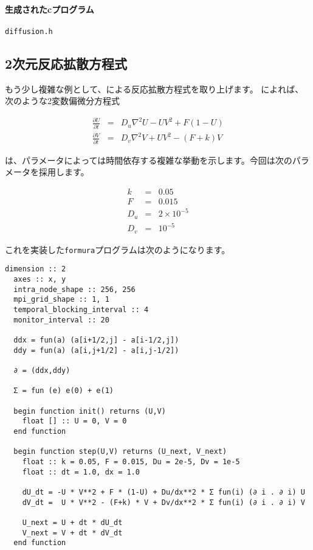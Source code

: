 \documentclass{jsarticle}
\newcommand{\formura}{{\texttt{formura}}}
\begin{document}
\paragraph{生成されたcプログラム}

\verb`diffusion.h`



\subsection{2次元反応拡散方程式}

もう少し複雑な例として、\citet{pearson1993complex}による反応拡散方程式を取り上げます。
\citet{pearson1993complex}によれば、次のような2変数偏微分方程式

\begin{eqnarray}
  \frac{\partial U}{\partial t} &=& D_u \nabla^2 U - UV^2 + F(1-U)\\
  \frac{\partial V}{\partial t} &=& D_v \nabla^2 V + UV^2 - (F+k)V
\end{eqnarray}

は、パラメータによっては時間依存する複雑な挙動を示します。今回は次のパラメータを採用します。

\begin{eqnarray}
  k &=& 0.05\\
  F &=& 0.015\\
  D_u &=& 2 \times 10^{-5}\\
  D_v &=& 10^{-5}
\end{eqnarray}

これを実装した\formura プログラムは次のようになります。

\begin{lstlisting}[mathescape]
  dimension :: 2
  axes :: x, y
  intra_node_shape :: 256, 256
  mpi_grid_shape :: 1, 1
  temporal_blocking_interval :: 4
  monitor_interval :: 20

  ddx = fun(a) (a[i+1/2,j] - a[i-1/2,j])
  ddy = fun(a) (a[i,j+1/2] - a[i,j-1/2])

  ∂ = (ddx,ddy)

  Σ = fun (e) e(0) + e(1)

  begin function init() returns (U,V)
    float [] :: U = 0, V = 0
  end function

  begin function step(U,V) returns (U_next, V_next)
    float :: k = 0.05, F = 0.015, Du = 2e-5, Dv = 1e-5
    float :: dt = 1.0, dx = 1.0

    dU_dt = -U * V**2 + F * (1-U) + Du/dx**2 * Σ fun(i) (∂ i . ∂ i) U
    dV_dt =  U * V**2 - (F+k) * V + Dv/dx**2 * Σ fun(i) (∂ i . ∂ i) V

    U_next = U + dt * dU_dt
    V_next = V + dt * dV_dt
  end function
\end{lstlisting}
\end{document}
